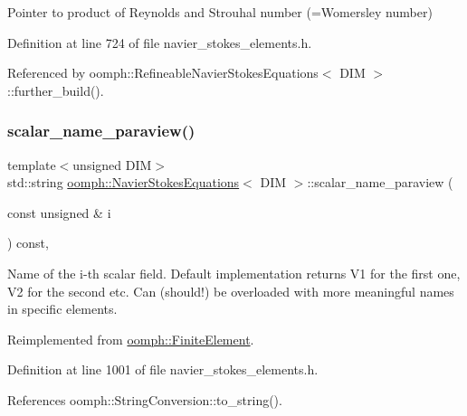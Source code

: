 Pointer to product of Reynolds and Strouhal number (=Womersley number) 



Definition at line 724 of file navier\+\_\+stokes\+\_\+elements.\+h.



Referenced by oomph\+::\+Refineable\+Navier\+Stokes\+Equations$<$ D\+I\+M $>$\+::further\+\_\+build().

\mbox{\label{classoomph_1_1NavierStokesEquations_afa71f5c316ebc4a76df5dc483b57a21d}} 
\subsubsection{\texorpdfstring{scalar\+\_\+name\+\_\+paraview()}{scalar\_name\_paraview()}}
{\footnotesize\ttfamily template$<$unsigned D\+IM$>$ \\
std\+::string \hyperlink{classoomph_1_1NavierStokesEquations}{oomph\+::\+Navier\+Stokes\+Equations}$<$ D\+IM $>$\+::scalar\+\_\+name\+\_\+paraview (\begin{DoxyParamCaption}\item[{const unsigned \&}]{i }\end{DoxyParamCaption}) const\hspace{0.3cm}{\ttfamily [inline]}, {\ttfamily [virtual]}}



Name of the i-\/th scalar field. Default implementation returns V1 for the first one, V2 for the second etc. Can (should!) be overloaded with more meaningful names in specific elements. 



Reimplemented from \hyperlink{classoomph_1_1FiniteElement_a49cc2d4f7ed5772bbc96f06760372b51}{oomph\+::\+Finite\+Element}.



Definition at line 1001 of file navier\+\_\+stokes\+\_\+elements.\+h.



References oomph\+::\+String\+Conversion\+::to\+\_\+string().

\mbox{\label{classoomph_1_1NavierStokesEquations_a5fbd9f03b5b658197cbb773a717f252b}} 
